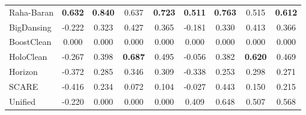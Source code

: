 \documentclass[10pt]{article} %
\numberwithin{equation}{section}
\begin{document}
\begin{table}[htbp]
\begin{subtable}[t]{0.492\linewidth}
\begin{tabular}{lcccccccc}
Raha-Baran  & \textbf{0.632} & \textbf{0.840} & 0.637 & \textbf{0.723} & \textbf{0.511} & \textbf{0.763} & 0.515 & \textbf{0.612} \\
BigDansing  & -0.222 & 0.323 & 0.427 & 0.365 & -0.181 & 0.330 & 0.413 & 0.366 \\
BoostClean  & 0.000 & 0.000 & 0.000 & 0.000 & 0.000 & 0.000 & 0.000 & 0.000 \\
HoloClean   & -0.267 & 0.398 & \textbf{0.687} & 0.495 & -0.056 & 0.382 & \textbf{0.620} & 0.469 \\
Horizon     & -0.372 & 0.285 & 0.346 & 0.309 & -0.338 & 0.253 & 0.298 & 0.271 \\
SCARE       & -0.416 & 0.234 & 0.072 & 0.104 & -0.027 & 0.443 & 0.150 & 0.215 \\
Unified     & -0.220 & 0.000 & 0.000 & 0.000 & 0.409 & 0.648 & 0.507 & 0.568 \\
\bottomrule
\end{tabular}
\end{subtable}

\vspace{1.5em}


\end{table}
\end{document}
